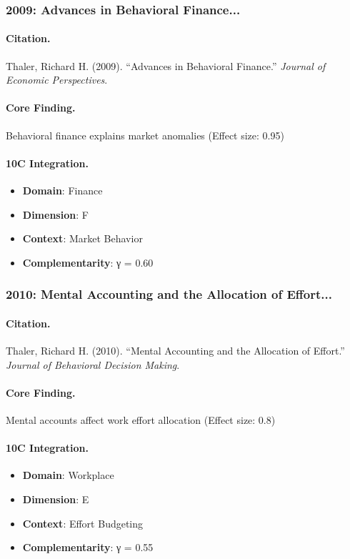 \subsubsection{2009: Advances in Behavioral Finance...}

\paragraph{Citation.}
Thaler, Richard H. (2009). ``Advances in Behavioral Finance.''
\textit{Journal of Economic Perspectives}.

\paragraph{Core Finding.}
Behavioral finance explains market anomalies (Effect size: 0.95)

\paragraph{10C Integration.}
\begin{itemize}[nosep]
  \item \textbf{Domain}: Finance
  \item \textbf{Dimension}: F
  \item \textbf{Context}: Market Behavior
  \item \textbf{Complementarity}: γ = 0.60
\end{itemize}

\subsubsection{2010: Mental Accounting and the Allocation of Effort...}

\paragraph{Citation.}
Thaler, Richard H. (2010). ``Mental Accounting and the Allocation of Effort.''
\textit{Journal of Behavioral Decision Making}.

\paragraph{Core Finding.}
Mental accounts affect work effort allocation (Effect size: 0.8)

\paragraph{10C Integration.}
\begin{itemize}[nosep]
  \item \textbf{Domain}: Workplace
  \item \textbf{Dimension}: E
  \item \textbf{Context}: Effort Budgeting
  \item \textbf{Complementarity}: γ = 0.55
\end{itemize}

